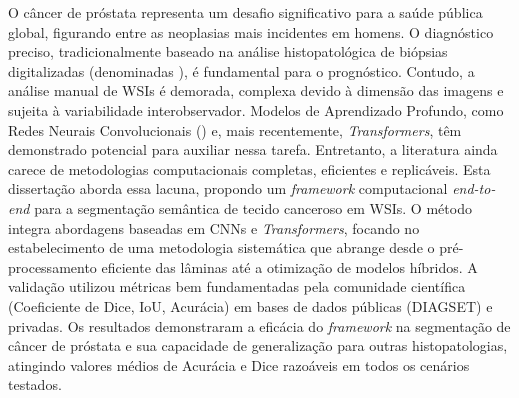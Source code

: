\documentclass[Portugues,Final]{tese-FT}
\begin{document}
\begin{resumo} 
O câncer de próstata representa um desafio significativo para a saúde pública global, figurando entre as neoplasias mais incidentes em homens. O diagnóstico preciso, tradicionalmente baseado na análise histopatológica de biópsias digitalizadas (denominadas ), é fundamental para o prognóstico. Contudo, a análise manual de WSIs é demorada, complexa devido à dimensão das imagens e sujeita à variabilidade interobservador. Modelos de Aprendizado Profundo, como Redes Neurais Convolucionais () e, mais recentemente, \textit{Transformers}, têm demonstrado potencial para auxiliar nessa tarefa. Entretanto, a literatura ainda carece de metodologias computacionais completas, eficientes e replicáveis. Esta dissertação aborda essa lacuna, propondo um \textit{framework} computacional \textit{end-to-end} para a segmentação semântica de tecido canceroso em WSIs. O método integra abordagens baseadas em CNNs e \textit{Transformers}, focando no estabelecimento de uma metodologia sistemática que abrange desde o pré-processamento eficiente das lâminas até a otimização de modelos híbridos. A validação utilizou métricas bem fundamentadas pela comunidade científica (Coeficiente de Dice, IoU, Acurácia) em bases de dados públicas (DIAGSET) e privadas. Os resultados demonstraram a eficácia do \textit{framework} na segmentação de câncer de próstata e sua capacidade de generalização para outras histopatologias, atingindo valores médios de Acurácia e Dice razoáveis em todos os cenários testados. 
\end{resumo}

\begin{abstract}
Prostate cancer represents a significant global public health challenge, ranking among the most frequent neoplasms in men. Accurate diagnosis, traditionally based on histopathological analysis of digitized biopsies (known as \textit{Whole Slide Images} -- WSI), is crucial for prognosis. However, manual analysis of WSIs is time-consuming, complex due to image dimensions, and subject to inter-observer variability. Deep Learning models, such as Convolutional Neural Networks (CNNs) and, more recently, \textit{Transformers}, have shown potential to assist in this task. Nevertheless, the literature still lacks complete, efficient, and replicable computational methodologies. This dissertation addresses this gap by proposing an \textit{end-to-end} computational \textit{framework} for the semantic segmentation of cancerous tissue in WSIs. The method integrates CNN and \textit{Transformer}-based approaches, focusing on establishing a systematic methodology that encompasses everything from efficient slide pre-processing to the optimization of hybrid models. Validation employed metrics well-established by the scientific community (Dice Coefficient,IoU, Accuracy) on public (DIAGSET) and private datasets. The results demonstrated the efficacy of the \textit{framework} in prostate cancer segmentation and its capability to generalize to other histopathologies, achieving average Accuracy and Dice resonable in all tested scenarios.
\end{abstract}
\end{document}
